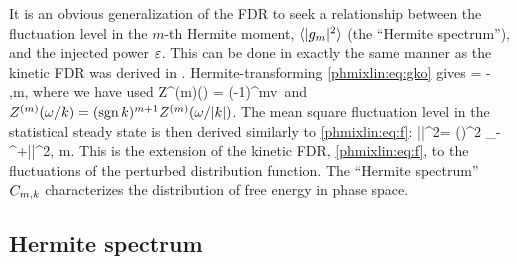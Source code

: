 It is an obvious generalization of the FDR to seek a relationship between 
the fluctuation level in the $m$-th Hermite moment, $\langle|g_m|^2\rangle$ 
(the ``Hermite spectrum''), and the injected power $\varepsilon$.
This can be done in exactly the same manner as the kinetic FDR was 
derived in . Hermite-transforming \eqref{phmixlin:eq:gko} gives   
\beq
\gmko = - 
,\quad m,
\label{phmixlin:eq:gm}
\eeq
where we have used 
\beq
Z^{(m)}(\zeta) \equiv {} = 
(-1)^m\int\rmd v\,
\label{phmixlin:eq:Zm}
\eeq
and $Z^{(m)}(\omega/k) = ({\rm sgn}\, k)^{m+1}Z^{(m)}(\omega/|k|)$. 
The mean square fluctuation level in the statistical steady state 
is then derived similarly to \eqref{phmixlin:eq:f}: 
\beq
\Cmk\equiv\la|\gmk|^2\ra = \lt(\rt)^2 
\int_{-\infty}^{+\infty}\rmd\zeta\lt|\rt|^2,
\quad m.
\label{phmixlin:eq:fm}
\eeq
This is the extension of the kinetic FDR, \eqref{phmixlin:eq:f}, to the fluctuations of the 
perturbed distribution function. The ``Hermite spectrum'' $C_{m,k}$ 
characterizes the distribution of free energy in phase space. 

\subsection{Hermite spectrum}
\label{phmixlin:sec:spectrum}

